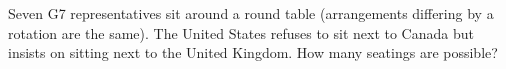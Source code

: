 Seven G7 representatives sit around a round table (arrangements differing by a rotation are the same). The United States refuses to sit next to Canada but insists on sitting next to the United Kingdom. How many seatings are possible?
